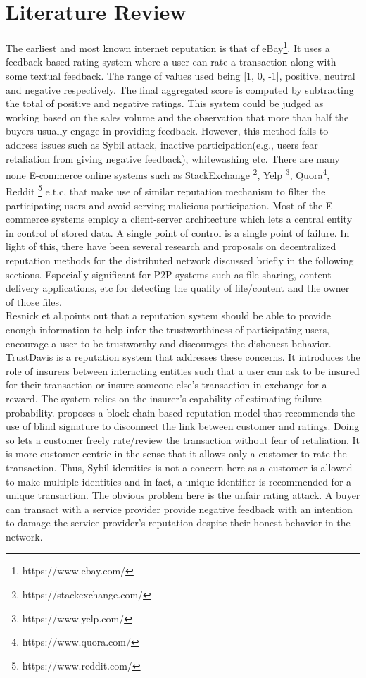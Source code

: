 \chapter{Literature Review} \label{ch:litrev}
The earliest and most known internet reputation is that of
eBay\footnote{https://www.ebay.com/}. It uses a feedback based rating system
where a user can rate a transaction along with some textual feedback. The range
of values used being [1, 0, -1], positive, neutral and negative respectively.
The final aggregated score is computed by subtracting the total of positive and
negative ratings. This system \cite{resnick2002trust} \cite{resnick2006value}
could be judged as working based on the sales volume and the observation that
more than half the buyers usually engage in providing feedback. However, this
method fails to address issues such as Sybil attack, inactive
participation(e.g., users fear retaliation from giving negative feedback),
whitewashing etc. There are many none E-commerce online systems such as
StackExchange \footnote{https://stackexchange.com/}, Yelp
\footnote{https://www.yelp.com/}, Quora\footnote{https://www.quora.com/},
Reddit \footnote{https://www.reddit.com/} e.t.c, that make use of similar
reputation mechanism to filter the participating users and avoid serving
malicious participation. Most of the E-commerce systems employ a client-server
architecture which lets a central entity in control of stored data.  A single
point of control is a single point of failure. In light of this, there have
been several research and proposals on decentralized reputation methods for the
distributed network discussed briefly in the following sections. Especially
significant for P2P systems such as file-sharing, content delivery
applications, etc for detecting the quality of file/content and the owner of
those files.\\
Resnick et al.\cite{resnick2000reputation}points out that a reputation system
should be able to provide enough information to help infer the trustworthiness
of participating users, encourage a user to be trustworthy and discourages the
dishonest behavior. TrustDavis \cite{defigueiredo2005trustdavis} is a
reputation system that addresses these concerns. It introduces the role of
insurers between interacting entities such that a user can ask to be insured
for their transaction or insure someone else's transaction in exchange for a
reward. The system relies on the insurer's capability of estimating failure
probability.  \cite{schaub2016trustless} proposes a block-chain based
reputation model that recommends the use of blind signature to disconnect
the link between customer and ratings. Doing so lets a customer freely
rate/review the transaction without fear of retaliation. It is more
customer-centric in the sense that it allows only a customer to rate the
transaction. Thus, Sybil identities is not a concern here as a customer is
allowed to make multiple identities and in fact, a unique identifier is
recommended for a unique transaction. The obvious problem here is the unfair
rating attack. A buyer can transact with a service provider provide negative
feedback with an intention to damage the service provider's reputation despite
their honest behavior in the network. 


